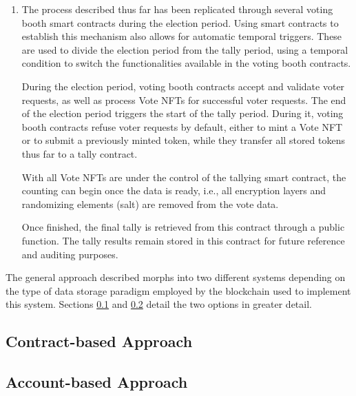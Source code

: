 \documentclass[../main.tex]{subfiles}
\begin{document}
\begin{enumerate}
                \item{The process described thus far has been replicated through several voting booth smart contracts during the election period. Using smart contracts to establish this mechanism also allows for automatic temporal triggers. These are used to divide the election period from the tally period, using a temporal condition to switch the functionalities available in the voting booth contracts. 
                \par
                During the election period, voting booth contracts accept and validate voter requests, as well as process Vote NFTs for successful voter requests. The end of the election period triggers the start of the tally period. During it, voting booth contracts refuse voter requests by default, either to mint a Vote NFT or to submit a previously minted token, while they transfer all stored tokens thus far to a tally contract.
                \par
                With all Vote NFTs are under the control of the tallying smart contract, the counting can begin once the data is ready, i.e., all encryption layers and randomizing elements (salt) are removed from the vote data.
                \par
                Once finished, the final tally is retrieved from this contract through a public function. The tally results remain stored in this contract for future reference and auditing purposes.}
            \end{enumerate}
        
        The general approach described morphs into two different systems depending on the type of data storage paradigm employed by the blockchain used to implement this system. Sections \ref{contract-based-approach} and \ref{account-based-approach} detail the two options in greater detail.

        \subsection{Contract-based Approach}
            \label{contract-based-approach}
            
        
        \subsection{Account-based Approach}
            \label{account-based-approach}
            
\end{document}
